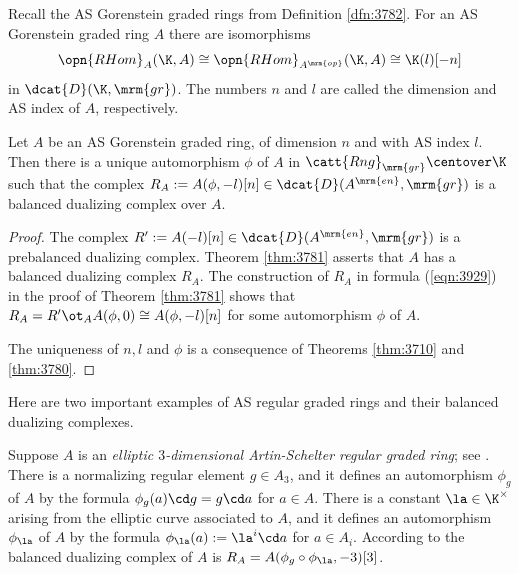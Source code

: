 Recall the AS Gorenstein graded rings from Definition 
\ref{dfn:3782}. For an AS Gorenstein graded ring $A$ there are isomorphisms 
\[ \opn{RHom}_{A}(\K, A) \cong  \opn{RHom}_{A^{\mrm{op}}}(\K, A) \cong
\K(l)[-n] \]
in $\dcat{D}(\K, \mrm{gr})$. The numbers $n$ and $l$ are called the dimension 
and AS index of $A$, respectively. 

\begin{cor}[\cite{Ye1}] \label{cor:3780}
Let $A$ be an AS Gorenstein graded ring, of dimension $n$ and 
with AS index $l$. Then there is a unique automorphism $\phi$ of $A$ 
in $\catt{Rng}_{\mrm{gr}} \centover \K$ such that the complex 
$R_A := A(\phi, -l)[n]  \in \dcat{D}(A^{\mrm{en}}, \mrm{gr})$
is a balanced dualizing complex over $A$. 
\end{cor}

\begin{proof}
The complex 
$R' := A(-l)[n] \in \dcat{D}(A^{\mrm{en}}, \mrm{gr})$
is a prebalanced dualizing complex. Theorem \ref{thm:3781} asserts that $A$ has 
a balanced dualizing complex $R_A$. The construction of $R_A$ in formula 
(\ref{eqn:3929}) in the proof of  Theorem \ref{thm:3781} shows that 
$R_A = R' \ot_A A(\phi, 0) \cong A(\phi, -l)[n]$ 
for some automorphism $\phi$ of $A$. 

The uniqueness of $n, l$ and $\phi$ is a consequence of Theorems \ref{thm:3710} 
and \ref{thm:3780}. 
\end{proof}

Here are two important examples of AS regular graded rings and their balanced 
dualizing complexes. 

\begin{exa} \label{exa:3780}
Suppose $A$ is an {\em elliptic $3$-dimensional Artin-Schelter regular graded 
ring}; see \cite{ATV}. There is a normalizing regular element $g \in A_3$, and 
it defines an automorphism $\phi_g$ of $A$ by the formula 
$\phi_g(a) \cd g = g \cd a$ for $a \in A$. There is a constant 
$\la \in \K^{\times}$
arising from the elliptic curve associated to $A$, and it  defines 
an automorphism $\phi_{\la}$ of $A$ by the formula 
$\phi_{\la}(a) := \la^i \cd a$ for $a \in A_i$. According to 
\cite[Theorem 7.18]{Ye1} the balanced dualizing complex of $A$ is 
$R_A = A(\phi_g \circ \phi_{\la}, -3)[3]$.
\end{exa}

